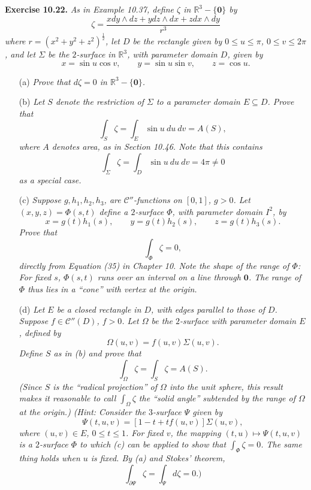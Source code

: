 \documentclass{article}
\begin{document}
\textbf{Exercise 10.22.}
\emph{As in Example 10.37, define $\zeta$ in $\mathbb{R}^3-\{\mathbf{0}\}$ by
\[
  \zeta = \frac{x dy \wedge dz + y dz \wedge dx + z dx \wedge dy}{r^3}
\]
where $r = (x^2+y^2+z^2)^{\frac{1}{2}}$,
let $D$ be the rectangle given by $0 \leq u \leq \pi$, $0 \leq v \leq 2\pi$,
and let $\Sigma$ be the $2$-surface in $\mathbb{R}^3$,
with parameter domain $D$, given by
\[
  x = \sin u \cos v,
  \qquad
  y = \sin u \sin v,
  \qquad
  z = \cos u.
\]}
\begin{enumerate}
\item[(a)]
  \emph{Prove that $d\zeta = 0$ in $\mathbb{R}^3 - \{ \mathbf{0} \}$.}

\item[(b)]
  \emph{Let $S$ denote the restriction of $\Sigma$ to a parameter domain $E \subseteq D$.
  Prove that
  \[
    \int_{S} \zeta
    = \int_{E} \sin u \: du \: dv
    = A(S),
  \]
  where $A$ denotes area, as in Section 10.46.
  Note that this contains
  \[
    \int_{\Sigma} \zeta
    = \int_{D} \sin u \: du \: dv
    = 4\pi \neq 0
  \]
  as a special case.}

\item[(c)]
  \emph{Suppose $g, h_1, h_2, h_3$, are $\mathscr{C}''$-functions on $[0,1]$, $g > 0$.
  Let $(x,y,z) = \Phi(s,t)$ define a $2$-surface $\Phi$,
  with parameter domain $I^2$, by
  \[
    x = g(t)h_1(s),
    \qquad
    y = g(t)h_2(s),
    \qquad
    z = g(t)h_3(s).
  \]
  Prove that
  \[
    \int_{\Phi} \zeta = 0,
  \]
  directly from Equation (35) in Chapter 10.
  Note the shape of the range of $\Phi$:
  For fixed $s$, $\Phi(s,t)$ runs over an interval on a line through $\mathbf{0}$.
  The range of $\Phi$ thus lies in a ``cone'' with vertex at the origin.}

\item[(d)]
  \emph{Let $E$ be a closed rectangle in $D$, with edges parallel to those of $D$.
  Suppose $f \in \mathscr{C}''(D)$, $f > 0$.
  Let $\Omega$ be the $2$-surface with parameter domain $E$,
  defined by
  \[
    \Omega(u,v) = f(u,v)\Sigma(u,v).
  \]
  Define $S$ as in (b) and prove that
  \[
    \int_{\Omega} \zeta = \int_{S} \zeta = A(S).
  \]
  (Since $S$ is the ``radical projection'' of $\Omega$ into the unit sphere,
  this result makes it reasonable to call $\int_{\Omega} \zeta$ the ``solid angle''
  subtended by the range of $\Omega$ at the origin.)
  (Hint:
  Consider the $3$-surface $\Psi$ given by
  \[
    \Psi(t,u,v) = [1-t+tf(u,v)]\Sigma(u,v),
  \]
  where $(u,v) \in E$, $0 \leq t \leq 1$.
  For fixed $v$, the mapping $(t,u) \mapsto \Psi(t,u,v)$ is a $2$-surface $\Phi$
  to which (c) can be applied to show that $\int_{\Phi} \zeta = 0$.
  The same thing holds when $u$ is fixed.
  By (a) and Stokes' theorem,
  \[
    \int_{\partial \Psi} \zeta = \int_{\Psi} d\zeta = 0.)
  \]}


\end{enumerate}
\end{document}
